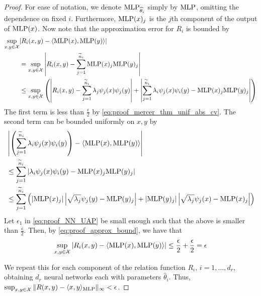 \begin{proof}
	For ease of notation, we denote \(\text{MLP}_{\widehat{\theta}_i}\) simply by \(\text{MLP}\), omitting the dependence on fixed \(i\). Furthermore, \(\text{MLP}(x)_j\) is the \(j\)th component of the output of \(\text{MLP}(x)\). Now note that the approximation error for \(R_i\) is bounded by
	\begin{equation}
		\label{eq:proof_approx_bound}
		\begin{split}
			\sup_{x, y \in \mathcal{X}}&{
				\left\lvert R_i(x,y) - \langle \MLP(x), \MLP(y) \rangle \right\rvert}\\
			&= \sup_{x, y \in \mathcal{X}}{
				\left\lvert R_i(x,y) - \sum_{j=1}^{\tilde{n}_i}{\MLP(x)_j \MLP(y)_j} \right\rvert} \\
			&\leq \sup_{x,y \in \mathcal{X}}{ \left(
				\left\lvert R_i(x,y) - \sum_{j=1}^{\tilde{n}_i}{\lambda_j \psi_j(x) \psi_j(y)} \right\rvert
				+ \left\lvert \sum_{j=1}^{\tilde{n}_i}{\lambda_i \psi_j(x) \psi_i(y) - \MLP(x)_j \MLP(y)_j} \right\rvert  \right) }
		\end{split}
	\end{equation}
	The first term is less than \(\frac{\epsilon}{2}\) by \eqref{eq:proof_mercer_thm_unif_abs_cv}. The second term can be bounded uniformly on \(x,y\) by
	\begin{equation*}
		\begin{split}
			&\left\lvert \left(\sum_{j=1}^{\tilde{n}_i}{\lambda_i \psi_j(x) \psi_i(y)}\right) - \langle \MLP(x), \MLP(y) \rangle \right\rvert  \\
			&\leq \sum_{j=1}^{\tilde{n}_i}{ \left\lvert \lambda_i \psi_j(x) \psi_i(y) - \MLP(x)_j \MLP(y)_j \right\rvert} \\
			&\leq \sum_{j=1}^{\tilde{n}_i}{\left(
				\left\lvert \MLP(x)_j \right\rvert \left\lvert \sqrt{\lambda_j} \psi_j(y) - \MLP(y)_j \right\rvert
				+ \lvert \MLP(y)_j \rvert \left\lvert \sqrt{\lambda_j} \psi_j(x) - \MLP(x)_j \right\rvert
				\right)}
		\end{split}
	\end{equation*}
	Let \(\epsilon_1\) in \eqref{eq:proof_NN_UAP} be small enough such that the above is smaller than \(\frac{\epsilon}{2}\). 	Then, by \eqref{eq:proof_approx_bound}, we have that
	\begin{equation*}
		\sup_{x, y \in \mathcal{X}}{
			\lvert R_i(x,y) - \langle \MLP(x), \MLP(y) \rangle \rvert} \leq \frac{\epsilon}{2} + \frac{\epsilon}{2} = \epsilon
	\end{equation*}

	We repeat this for each component of the relation function \(R_i\), \(i=1, \ldots, d_r\), obtaining \(d_r\) neural networks each with parameters \(\hat{\theta}_i\). Thus, \(\sup_{x,y \in \mathcal{X}}{\lVert R(x,y) - \langle x, y \rangle_{\text{MLP}} \rVert_\infty} < \epsilon\).
\end{proof}

